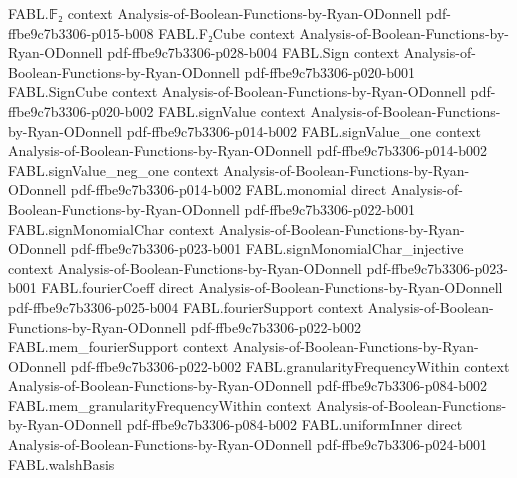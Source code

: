 \begin{theorem}
\label{FABL.blrUniformStringTester_acceptance_eq_value}
\leanok
{}
\proofstep
  {FABL.𝔽₂}
  {context}
  {Analysis-of-Boolean-Functions-by-Ryan-ODonnell}
  {pdf-ffbe9c7b3306-p015-b008}
\proofstep
  {FABL.F₂Cube}
  {context}
  {Analysis-of-Boolean-Functions-by-Ryan-ODonnell}
  {pdf-ffbe9c7b3306-p028-b004}
\proofstep
  {FABL.Sign}
  {context}
  {Analysis-of-Boolean-Functions-by-Ryan-ODonnell}
  {pdf-ffbe9c7b3306-p020-b001}
\proofstep
  {FABL.SignCube}
  {context}
  {Analysis-of-Boolean-Functions-by-Ryan-ODonnell}
  {pdf-ffbe9c7b3306-p020-b002}
\proofstep
  {FABL.signValue}
  {context}
  {Analysis-of-Boolean-Functions-by-Ryan-ODonnell}
  {pdf-ffbe9c7b3306-p014-b002}
\proofstep
  {FABL.signValue_one}
  {context}
  {Analysis-of-Boolean-Functions-by-Ryan-ODonnell}
  {pdf-ffbe9c7b3306-p014-b002}
\proofstep
  {FABL.signValue_neg_one}
  {context}
  {Analysis-of-Boolean-Functions-by-Ryan-ODonnell}
  {pdf-ffbe9c7b3306-p014-b002}
\proofstep
  {FABL.monomial}
  {direct}
  {Analysis-of-Boolean-Functions-by-Ryan-ODonnell}
  {pdf-ffbe9c7b3306-p022-b001}
\proofstep
  {FABL.signMonomialChar}
  {context}
  {Analysis-of-Boolean-Functions-by-Ryan-ODonnell}
  {pdf-ffbe9c7b3306-p023-b001}
\proofstep
  {FABL.signMonomialChar_injective}
  {context}
  {Analysis-of-Boolean-Functions-by-Ryan-ODonnell}
  {pdf-ffbe9c7b3306-p023-b001}
\proofstep
  {FABL.fourierCoeff}
  {direct}
  {Analysis-of-Boolean-Functions-by-Ryan-ODonnell}
  {pdf-ffbe9c7b3306-p025-b004}
\proofstep
  {FABL.fourierSupport}
  {context}
  {Analysis-of-Boolean-Functions-by-Ryan-ODonnell}
  {pdf-ffbe9c7b3306-p022-b002}
\proofstep
  {FABL.mem_fourierSupport}
  {context}
  {Analysis-of-Boolean-Functions-by-Ryan-ODonnell}
  {pdf-ffbe9c7b3306-p022-b002}
\proofstep
  {FABL.granularityFrequencyWithin}
  {context}
  {Analysis-of-Boolean-Functions-by-Ryan-ODonnell}
  {pdf-ffbe9c7b3306-p084-b002}
\proofstep
  {FABL.mem_granularityFrequencyWithin}
  {context}
  {Analysis-of-Boolean-Functions-by-Ryan-ODonnell}
  {pdf-ffbe9c7b3306-p084-b002}
\proofstep
  {FABL.uniformInner}
  {direct}
  {Analysis-of-Boolean-Functions-by-Ryan-ODonnell}
  {pdf-ffbe9c7b3306-p024-b001}
\proofstep
  {FABL.walshBasis}

\end{theorem}
